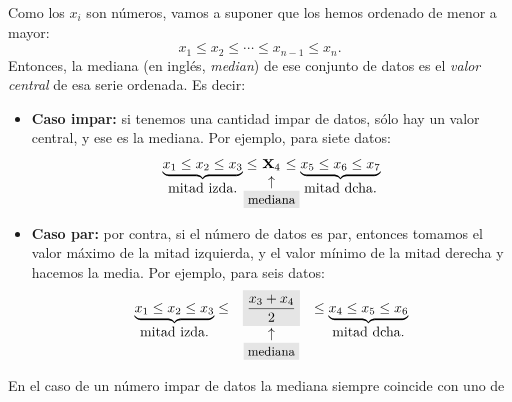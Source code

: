 Como los $x_i$ son números, vamos a suponer que los hemos ordenado de menor a
mayor:
    \[x_1\leq x_2\leq\cdots\leq x_{n-1}\leq x_n.\]
Entonces, la {\sf mediana} (en inglés, {\em median}) de ese conjunto
de datos es el {\em valor central} de esa serie ordenada. Es decir:
    \begin{itemize}
        \item[]{\bf Caso impar:} si tenemos una cantidad impar de datos, sólo
            hay un valor central, y ese es la mediana. Por ejemplo, para
            siete datos:
                \[
                \begin{array}{rcl}
                \underbrace{x_1\leq x_2\leq x_3}_{\mbox{mitad izda.}}\leq &
                \hspace{-7mm}{\text{\Large{\bf x}}}_4 &\hspace{-7mm}\leq
                \underbrace{x_5\leq x_6\leq x_7}_{\mbox{mitad dcha.}}\\[-5mm]
                &\hspace{-7mm}\uparrow&\\
                &\hspace{-7mm}\colorbox{lightgrey}{\mbox{\small mediana}}&
                \end{array}
                \]

        \item[]{\bf Caso par:} por contra, si el número de datos es par,
            entonces tomamos el valor máximo de la mitad izquierda, y el
            valor mínimo de la mitad derecha y hacemos la media. Por ejemplo,
            para seis datos:
                \[
                \begin{array}{rcl}
                \underbrace{x_1\leq x_2\leq x_3}_{\mbox{mitad izda.}}\leq &\hspace{0mm}\colorbox{lightgrey}{$\dfrac{x_3+x_4}{2}$}&\hspace{0mm}\leq
                \underbrace{x_4\leq x_5\leq x_6}_{\mbox{mitad dcha.}}\\[-3mm]
                &\hspace{0mm}{\uparrow}&\\
                &\hspace{0mm}\colorbox{lightgrey}{\mbox{\small mediana}}&
                \end{array}
                \]

        \end{itemize}
En el caso de un número impar de datos la mediana siempre coincide con uno de
